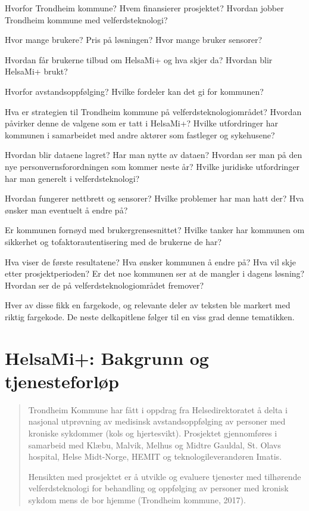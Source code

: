 \begin{description}[leftmargin=!,labelwidth=\widthof{\bfseries Brukeropplevelse og sikkerhet}]
    \item[Bakgrunn for HelsaMi+] Hvorfor Trondheim kommune? Hvem finansierer prosjektet? Hvordan jobber Trondheim kommune med
		velferdsteknologi?
	\item[Om HelsaMi+ per i dag] Hvor mange brukere? Pris på løsningen? Hvor mange bruker sensorer?
	\item[Tjenesteforløp i HelsaMi+] Hvordan får brukerne tilbud om HelsaMi+ og hva skjer da? Hvordan blir HelsaMi+ brukt?
	\item[Motivasjon for HelsaMi+] Hvorfor avstandsoppfølging? Hvilke fordeler kan det gi for kommunen?
	\item[Politikk og samhandling] Hva er strategien til Trondheim kommune på velferdsteknologiområdet? Hvordan påvirker denne
		de valgene som er tatt i HelsaMi+? Hvilke utfordringer har kommunen i samarbeidet med andre aktører som fastleger og sykehusene?
	\item[Juridiske utfordringer] Hvordan blir dataene lagret? Har man nytte av dataen? Hvordan ser man på den nye personvernsforordningen som kommer
		neste år? Hvilke juridiske utfordringer har man generelt i velferdsteknologi?
	\item[Tekniske utfordinger] Hvordan fungerer nettbrett og sensorer? Hvilke problemer har man hatt der? Hva ønsker man eventuelt å endre på?
    \item[Brukeropplevelse og sikkerhet] Er kommunen fornøyd med brukergrensesnittet? Hvilke tanker har kommunen om sikkerhet
        og tofaktorautentisering med de brukerne de har?
    \item[Tilbakemeldinger og planer] Hva viser de første resultatene? Hva ønsker kommunen å endre på? Hva vil skje etter prosjektperioden?
        Er det noe kommunen ser at de mangler i dagens løsning? Hvordan ser de på velferdsteknologiområdet fremover?
\end{description}

Hver av disse fikk en fargekode, og relevante deler av teksten ble markert med
riktig fargekode. De neste delkapitlene følger til en viss grad denne tematikken.

\section{HelsaMi+: Bakgrunn og tjenesteforløp}
\blockquote{
Trondheim Kommune har fått i oppdrag fra Helsedirektoratet å delta i nasjonal utprøvning av medisinsk avstandsoppfølging av personer med kroniske sykdommer (kols og
hjertesvikt). Prosjektet gjennomføres i samarbeid med Klæbu, Malvik, Melhus og Midtre Gauldal, St. Olavs hospital, Helse Midt-Norge, HEMIT og teknologileverandøren
Imatis.

Hensikten med prosjektet er å utvikle og evaluere tjenester med tilhørende velferdsteknologi for behandling og oppfølging av personer med kronisk sykdom mens de bor
hjemme (Trondheim kommune, 2017). %
}

